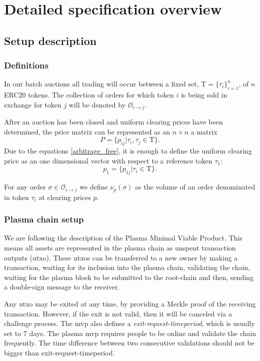 \documentclass[11pt,parskip=full]{scrartcl}%
\newcommand{\Tau}{\mathrm{T}}
\def\pO{\mathcal{O}}
\def\ra{\rightarrow}
\newcommand*{\erc}{ERC20 }
\begin{document}
\newpage

\section{Detailed specification overview}
\subsection{Setup description}

\subsubsection{Definitions}


In our batch auctions all trading will occur between a fixed set, $\Tau = \{\tau_i\}_{i=1}^n$, of $n$ \erc tokens. The collection of orders for which token $i$ is being sold in exchange for token $j$ will be denoted by $\pO_{i\ra j}$. 

After an auction has been closed and uniform clearing prices have been determined, the price matrix can be represented as an $n\times n$ a matrix 
\[P = \{p_{ij}| \tau_i, \tau_j \in \Tau \}.\]
Due to the equations \ref{arbitrage_free}, it is enough to define the uniform clearing price as an one dimensional vector with respect to a reference token $\tau_1$:
\[p_1 = \{p_{1j}| \tau_i \in \Tau \}.\]

For any order $\sigma \in \pO_{i\ra j}$ we define $\nu_p(\sigma)$ as the volume of an order denominated in token $\tau_i$ at clearing prices $p$.


\subsubsection{Plasma chain setup}
We are following the description of the Plasma Minimal Viable Product\cite{MVP}. 
This means all assets are represented in the plasma chain as unspent transaction outputs (utxo). 
These utxos can be transferred to a new owner by making a transaction, waiting for its inclusion into the plasma chain, validating the chain, waiting for the plasma block to be submitted to the root-chain and then, sending a double-sign message to the receiver. 

Any utxo may be exited at any time, by providing a Merkle proof of the receiving transaction. 
However, if the exit is not valid, then it will be canceled via a challenge process.
The mvp also defines a \emph{exit-request-timeperiod}\label{exit-time}, which is usually set to 7 days. The plasma mvp requires people to be online and validate the chain frequently.
The time difference between two consecutive validations should not be bigger than exit-request-timeperiod.
\end{document}
